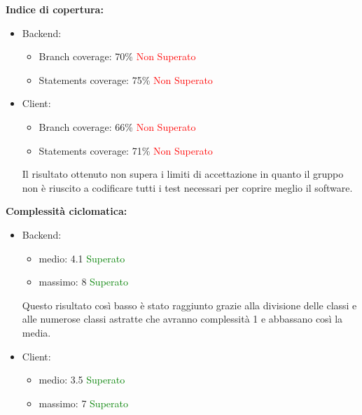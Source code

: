 			\begin{description}
				\item \textbf{Indice di copertura:}				
				\begin{itemize}
						\item Backend:
							\begin{itemize}
								\item Branch coverage: 70\% \textcolor{red}{Non Superato}
								\item Statements coverage: 75\% \textcolor{red}{Non Superato}
							\end{itemize}
						\item Client:
							\begin{itemize}
								\item Branch coverage: 66\% \textcolor{red}{Non Superato}
								\item Statements coverage: 71\% \textcolor{red}{Non Superato}
							\end{itemize}
						Il risultato ottenuto non supera i limiti di accettazione in quanto il gruppo non è riuscito a codificare tutti i test necessari per coprire meglio il software.
					\end{itemize}
				
				\item \textbf{Complessità ciclomatica:}
					\begin{itemize}
						\item Backend:
							\begin{itemize}
								\item medio: 4.1 \textcolor{green}{Superato}
								\item massimo: 8 \textcolor{green}{Superato}
							\end{itemize}
						Questo risultato così basso è stato raggiunto grazie alla divisione delle classi e alle numerose classi astratte che avranno complessità 1 e abbassano così la media.
						\item Client:
							\begin{itemize}
								\item medio: 3.5 \textcolor{green}{Superato}
								\item massimo: 7 \textcolor{green}{Superato}
							\end{itemize}
					\end{itemize}
						

\end{description}
